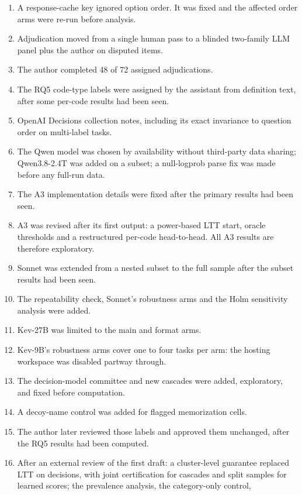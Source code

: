 \begin{enumerate}
  \item A response-cache key ignored option order. It was fixed and the affected order arms were re-run before analysis.
  \item Adjudication moved from a single human pass to a blinded two-family LLM panel plus the author on disputed items.
  \item The author completed 48 of 72 assigned adjudications.
  \item The RQ5 code-type labels were assigned by the assistant from definition text, after some per-code results had been seen.
  \item OpenAI Decisions collection notes, including its exact invariance to question order on multi-label tasks.
  \item The Qwen model was chosen by availability without third-party data sharing; Qwen3.8-2.4T was added on a subset; a
  null-logprob parse fix was made before any full-run data.
  \item The A3 implementation details were fixed after the primary results had been seen.
  \item A3 was revised after its first output: a power-based LTT start, oracle thresholds and a restructured per-code
  head-to-head. All A3 results are therefore exploratory.
  \item Sonnet was extended from a nested subset to the full sample after the subset results had been seen.
  \item The repeatability check, Sonnet's robustness arms and the Holm sensitivity analysis were added.
  \item Kev-27B was limited to the main and format arms.
  \item Kev-9B's robustness arms cover one to four tasks per arm: the hosting workspace was disabled partway through.
  \item The decision-model committee and new cascades were added, exploratory, and fixed before computation.
  \item A decoy-name control was added for flagged memorization cells.
  \item The author later reviewed those labels and approved them unchanged, after the RQ5 results had been computed.
  \item After an external review of the first draft: a cluster-level guarantee replaced LTT on decisions, with joint
  certification for cascades and split samples for learned scores; the prevalence analysis, the category-only control,

\end{enumerate}
